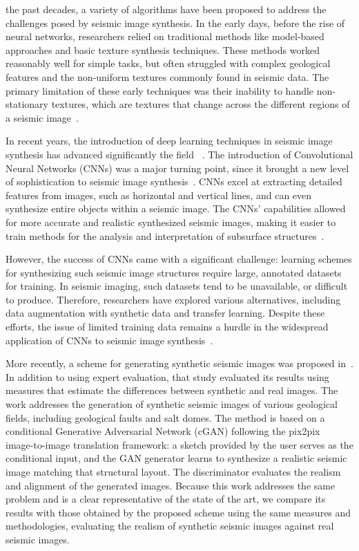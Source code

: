 \documentclass{ieeeaccess}
\begin{document}
 the past decades, a variety of algorithms have been proposed to address the challenges posed by seismic image synthesis. In the early days, before the rise of neural networks, researchers relied on traditional methods like model-based approaches and basic texture synthesis techniques. These methods worked reasonably well for simple tasks,  but often struggled with complex geological features and the non-uniform textures commonly found in seismic data. The primary limitation of these early techniques was their inability to handle non-stationary textures, which are textures that change across the different regions of a seismic image~\cite{Zhou2018}.

In recent years, the introduction of deep learning techniques in seismic image synthesis has advanced significantly the field ~\cite{Zeng2019}. The introduction of Convolutional Neural Networks (CNNs) was a major turning point, since it brought a new level of sophistication to seismic image synthesis~\cite{Powers2011}. CNNs excel at extracting detailed features from images, such as horizontal and vertical lines, and can even synthesize entire objects within a seismic image. The CNNs' capabilities allowed for more accurate and realistic synthesized seismic images, making it easier to train methods for the analysis and interpretation of subsurface structures~\cite{Powers2011}. 

However, the success of CNNs came with a significant challenge: learning schemes for synthesizing such seismic image structures require large, annotated datasets for training. In seismic imaging, such datasets tend to be unavailable, or difficult to produce. Therefore, researchers have explored various alternatives, including data augmentation with synthetic data and transfer learning. Despite these efforts, the issue of limited training data remains a hurdle in the widespread application of CNNs to seismic image synthesis~\cite{Wang2021}.

More recently, a scheme for generating synthetic seismic images was proposed in~\cite{Ferreira2020}. In addition to using expert evaluation, that study evaluated its results using measures that estimate the differences between synthetic and real images. The work addresses the generation of synthetic seismic images of various geological fields, including geological faults and salt domes. The method is based on a conditional Generative Adversarial Network (cGAN) following the pix2pix~\cite{pix2pix2017} image-to-image translation framework: a sketch provided by the user serves as the conditional input, and the GAN generator learns to synthesize a realistic seismic image matching that structural layout. The discriminator evaluates the realism and alignment of the generated images. Because this work addresses the same problem and is a clear representative of the state of the art, we compare its results with those obtained by the proposed scheme using the same measures and methodologies, evaluating the realism of synthetic seismic images against real seismic images.
\end{document}
